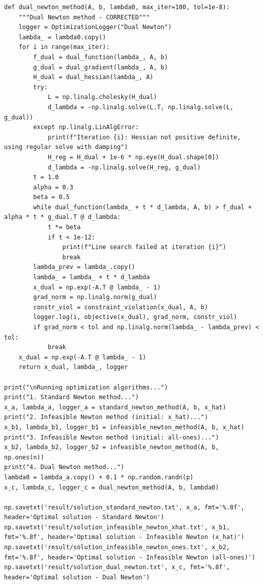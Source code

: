 \documentclass{article}
\newenvironment{solution_cn}{%
  \begin{proof}[解答]%
  \kaishu  %
}{%
  \end{proof}%
}
\begin{document}
\begin{solution_cn}
\begin{lstlisting}[caption={run.py}]
def dual_newton_method(A, b, lambda0, max_iter=100, tol=1e-8):
    """Dual Newton method - CORRECTED"""
    logger = OptimizationLogger("Dual Newton")
    lambda_ = lambda0.copy()
    for i in range(max_iter):
        f_dual = dual_function(lambda_, A, b)
        g_dual = dual_gradient(lambda_, A, b)
        H_dual = dual_hessian(lambda_, A)
        try:
            L = np.linalg.cholesky(H_dual)
            d_lambda = -np.linalg.solve(L.T, np.linalg.solve(L, g_dual))
        except np.linalg.LinAlgError:
            print(f"Iteration {i}: Hessian not positive definite, using regular solve with damping")
            H_reg = H_dual + 1e-6 * np.eye(H_dual.shape[0])
            d_lambda = -np.linalg.solve(H_reg, g_dual)
        t = 1.0
        alpha = 0.3
        beta = 0.5
        while dual_function(lambda_ + t * d_lambda, A, b) > f_dual + alpha * t * g_dual.T @ d_lambda:
            t *= beta
            if t < 1e-12:
                print(f"Line search failed at iteration {i}")
                break
        lambda_prev = lambda_.copy()
        lambda_ = lambda_ + t * d_lambda
        x_dual = np.exp(-A.T @ lambda_ - 1)
        grad_norm = np.linalg.norm(g_dual)
        constr_viol = constraint_violation(x_dual, A, b)
        logger.log(i, objective(x_dual), grad_norm, constr_viol)
        if grad_norm < tol and np.linalg.norm(lambda_ - lambda_prev) < tol:
            break
    x_dual = np.exp(-A.T @ lambda_ - 1)
    return x_dual, lambda_, logger

print("\nRunning optimization algorithms...")
print("1. Standard Newton method...")
x_a, lambda_a, logger_a = standard_newton_method(A, b, x_hat)
print("2. Infeasible Newton method (initial: x_hat)...")
x_b1, lambda_b1, logger_b1 = infeasible_newton_method(A, b, x_hat)
print("3. Infeasible Newton method (initial: all-ones)...")
x_b2, lambda_b2, logger_b2 = infeasible_newton_method(A, b, np.ones(n))
print("4. Dual Newton method...")
lambda0 = lambda_a.copy() + 0.1 * np.random.randn(p)
x_c, lambda_c, logger_c = dual_newton_method(A, b, lambda0)

np.savetxt('result/solution_standard_newton.txt', x_a, fmt='%.8f', header='Optimal solution - Standard Newton')
np.savetxt('result/solution_infeasible_newton_xhat.txt', x_b1, fmt='%.8f', header='Optimal solution - Infeasible Newton (x_hat)')
np.savetxt('result/solution_infeasible_newton_ones.txt', x_b2, fmt='%.8f', header='Optimal solution - Infeasible Newton (all-ones)')
np.savetxt('result/solution_dual_newton.txt', x_c, fmt='%.8f', header='Optimal solution - Dual Newton')


\end{lstlisting}
\end{solution_cn}
\end{document}
